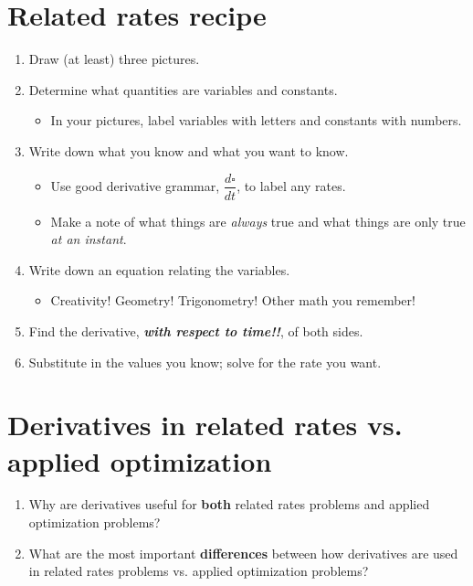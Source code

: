 \hrulefill

\section{Related rates recipe}

\begin{enumerate}[leftmargin=15pt]
    \item Draw (at least) three pictures.
    \item Determine what quantities are variables and constants.
    \begin{itemize}
        \item In your pictures, label variables with letters and constants with numbers.
    \end{itemize}
    \item Write down what you know and what you want to know.
    \begin{itemize}
        \item Use good derivative grammar, \(\dfrac{d\square}{dt}\), to label any rates.
        \item Make a note of what things are \textit{always} true and what things are only true \textit{at an instant}.
    \end{itemize}
    \item Write down an equation relating the variables.
    \begin{itemize}
        \item Creativity! Geometry! Trigonometry! Other math you remember!
    \end{itemize}
    \item Find the derivative, \textit{\textbf{with respect to time!!}}, of both sides.
    \item Substitute in the values you know; solve for the rate you want.

\end{enumerate}

\pagebreak

\section{Derivatives in related rates vs. applied optimization}

\begin{enumerate}[leftmargin=15pt]
    \item Why are derivatives useful for \textbf{both} related rates problems and applied optimization problems?
    \vfill
    \item What are the most important \textbf{differences} between how derivatives are used in related rates problems vs. applied optimization problems?
    \vfill
\end{enumerate}

